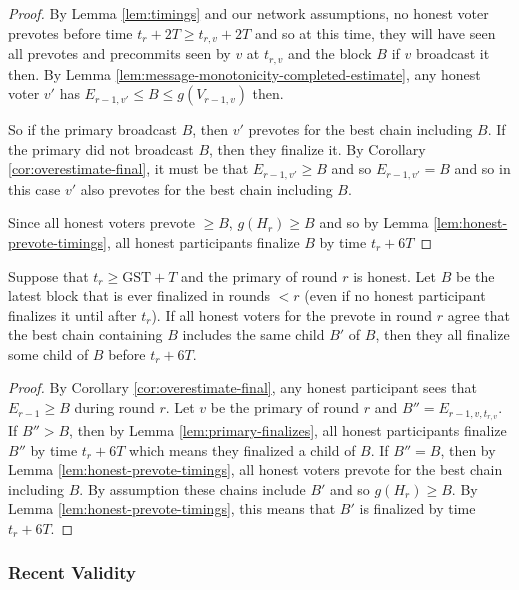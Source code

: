 \documentclass[a4paper,UKenglish,cleveref, autoref, thm-restate, anonymous]{lipics-v2019}
\def\GST{\mathrm{GST}}
\begin{document}
\begin{proof} By Lemma \ref{lem:timings} and our network assumptions, no honest voter  prevotes before time $t_r+2T \geq t_{r,v}+2T$ and so at this time, they will have seen all prevotes and precommits seen by $v$ at $t_{r,v}$ and the block $B$ if $v$ broadcast it then. By Lemma \ref{lem:message-monotonicity-completed-estimate}, any honest voter $v'$ has $E_{r-1,v'} \leq B \leq g(V_{r-1,v})$ then.

So if the primary broadcast $B$, then $v'$ prevotes for the best chain including $B$. If the primary did not broadcast $B$, then they finalize it. By Corollary \ref{cor:overestimate-final}, it must be that $E_{r-1,v'} \geq B$ and so $E_{r-1,v'}=B$ and so in this case $v'$ also prevotes for the best chain including $B$.

Since all honest voters prevote $\geq B$, $g(H_r) \geq B$ and so by Lemma \ref{lem:honest-prevote-timings}, all honest participants finalize $B$ by time $t_r+6T$
\end{proof}



\begin{lemma}
 Suppose that $t_r \geq \GST+T$ and the primary of round $r$ is honest. 
Let $B$ be the latest block that is ever finalized in rounds  $<r$ (even if no honest participant finalizes it until after $t_r$). If all honest voters for the prevote in round $r$ agree that the best chain containing $B$ includes the same child $B'$ of $B$, then they all finalize some child of $B$ before $t_r+6T$.
\end{lemma}

\begin{proof} By Corollary \ref{cor:overestimate-final}, any honest participant sees that $E_{r-1} \geq B$ during round $r$. Let $v$ be the primary of round $r$ and $B''=E_{r-1,v,t_{r,v}}$. If $B'' > B$, then by Lemma \ref{lem:primary-finalizes}, all honest participants finalize $B''$ by time $t_r+6T$ which means they finalized a child of $B$. If $B''=B$, then by Lemma \ref{lem:honest-prevote-timings}, all honest voters prevote for the best chain including $B$.
By assumption these chains include $B'$ and so $g(H_r) \geq B$. By Lemma \ref{lem:honest-prevote-timings}, this means that $B'$ is finalized by time $t_r+6T$.
\end{proof}







\subsubsection{Recent Validity}
\end{document}
